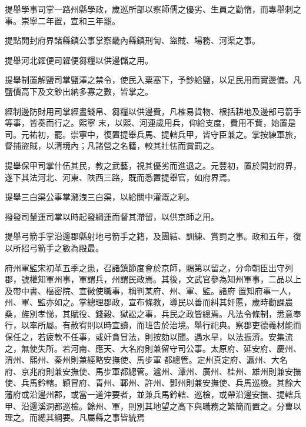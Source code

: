 \begin{pinyinscope}
 提舉學事司掌一路州縣學政，歲巡所部以察師儒之優劣、生員之勤惰，而專舉刺之事。崇寧二年置，宣和三年罷。



 提點開封府界諸縣鎮公事掌察畿內縣鎮刑訇、盜賊、場務、河渠之事。



 提舉河北糴便司糴便芻糧以供邊儲之用。



 提舉制置解鹽司掌鹽澤之禁令，使民入粟塞下，予鈔給鹽，以足民用而實邊備。凡鹽價高下及文鈔出納多寡之數，皆掌之。



 經制邊防財用司掌經晝錢帛、芻糧以供邊費，凡榷易貨物、根括耕地及邊部弓箭手等事，皆奏而行之。熙寧
 末，以熙、河連歲用兵，仰給支度，費用不貲，始置是司。元祐初，罷。崇寧中，復置提舉兵馬、提轄兵甲，皆守臣兼之。掌按練軍旅，督捕盜賊，以清境內；凡諸營之名籍，較其壯怯而賞罰之。



 提舉保甲司掌什伍其民，教之武藝，視其優劣而進退之。元豐初，置於開封府界，遂下其法河北、河東、陜西三路，既而悉置提舉官，如府界焉。



 提舉三白渠公事掌瀦洩三白渠，以給關中灌溉之利。



 撥發司輦運司掌以時起發綱運而督其滯留，以供京師之用。



 提舉弓箭手掌沿邊郡縣射地弓箭手之籍，及團結、訓練、賞罰之事。政和五年，復以所招弓箭手之數為殿最。



 府州軍監宋初革五季之患，召諸鎮節度會於京師，賜第以留之，分命朝臣出守列郡，號權知軍州事，軍謂兵，州謂民政焉。其後，文武官參為知州軍事，二品以上及帶中書、樞密院、宣徽使職事，稱判某府、州、軍、監。諸府
 置知府事一人，州、軍、監亦如之。掌總理郡政，宣布條教，導民以善而糾其奸慝，歲時勸課農桑，旌別孝悌，其賦役、錢穀、獄訟之事，兵民之政皆總焉。凡法令條制，悉意奉行，以率所屬。有赦宥則以時宣讀，而班告於治境。舉行祀典。察郡吏德義材能而保任之，若疲軟不任事，或奸貪冒法，則按劾以聞。遇水旱，以法振濟。安集流之，無使失所。若河南、應天、大名府則兼留守司公事。太原府、延安府、慶州、渭州、熙州、秦州則兼經略安撫使、馬步軍
 都總管。定州真定府、瀛州、大名府、京兆府則兼安撫使、馬步軍都總管。瀘州、潭州、廣州、桂州、雄州則兼安撫使、兵馬鈐轄。穎冒府、青州、鄆州、許州、鄧州則兼安撫使、兵馬巡檢。其餘大藩府或沿邊州郡，或當一道沖要者，並兼兵馬鈐轄、巡檢，或帶沿邊安撫、提轄兵甲、沿邊溪洞都巡檢。餘州、軍，則別其地望之高下與職務之繁簡而置之。分曹以理之。而總其綱要。凡屬縣之事皆統焉




\end{pinyinscope}
